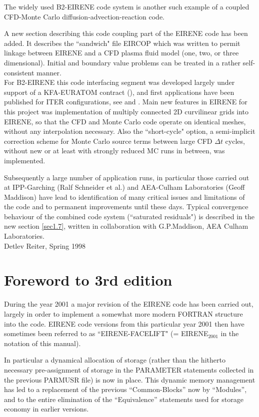 The widely used B2-EIRENE code system \cite{kn:Reiter91b} is another such example of a coupled CFD-Monte Carlo diffusion-advection-reaction code.

A new section describing this code coupling part of the EIRENE code has been added.
It describes the ``sandwich" file EIRCOP which was written to permit
linkage between EIRENE and a CFD plasma fluid model (one, two,
or
three dimensional).
Initial and boundary value problems can be treated in
a rather self-consistent manner.
\\
For B2-EIRENE this code interfacing segment was developed
largely under support of a KFA-EURATOM contract (\cite{kn:Net}), and first
applications have been published for ITER configurations, see
\cite{kn:Reiter91b} and
\cite{kn:Maddison91}.
Main new features in EIRENE for this project was implementation of multiply connected 2D curvilinear
grids into EIRENE, so that the CFD and Monte Carlo code operate on identical meshes, without any interpolation
necessary. Also the ``short-cycle" option, a semi-implicit correction scheme for Monte Carlo source terms between
large CFD $\Delta t$ cycles, without new or at least with strongly reduced MC runs in between, was implemented.


Subsequently a large number of application runs, in particular those
carried out at IPP-Garching (Ralf Schneider et al.) and AEA-Culham Laboratories
(Geoff Maddison) have lead to identification of many critical issues
and limitations of the code and to permanent improvements
until these days. Typical convergence behaviour of the combined code
system (``saturated residuals") is described in the new section
\ref{sec1.7}, written
in collaboration with G.P.Maddison, AEA Culham
Laboratories.\\
Detlev Reiter, Spring         1998

\section*{Foreword to 3rd edition}
\label{forew3}
\bigskip
During the year 2001 a major revision of the EIRENE code has
been carried out, largely in order to implement a somewhat more modern FORTRAN
structure into the code. EIRENE code versions from this particular year 2001 then have sometimes been
referred to as ``EIRENE-FACELIFT"  (= EIRENE$_{2001}$ in the notation of this manual).

In particular a dynamical allocation of storage (rather than the
hitherto necessary pre-assignment of storage in the PARAMETER
statements collected in the previous PARMUSR file) is now in
place. This dynamic memory management has led to a replacement of
the previous ``Common-Blocks'' now by ``Modules'',
and to the entire elimination of the
``Equivalence'' statements used for storage economy in earlier versions.

